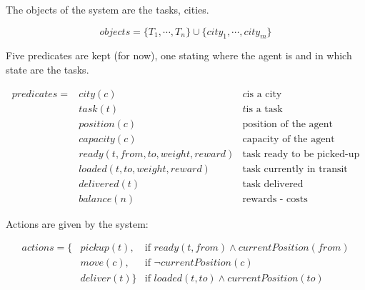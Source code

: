 \documentclass[11pt,a4paper]{article}
\begin{document}
The objects of the system are the tasks, cities.

$$ objects = \{T_1, \cdots, T_n\} \cup \{city_1, \cdots, city_m\} $$

Five predicates are kept (for now), one stating where the agent is and in which
state are the tasks.

\begin{align*}
predicates = &city(c)                            & c \text{is a city} \\
             &task(t)                            & t \text{is a task} \\
             &position(c)                        & \text{position of the agent}      \\
             &capacity(c)                        & \text{capacity of the agent}      \\
             &ready(t, from, to, weight, reward) & \text{task ready to be picked-up} \\
             &loaded(t, to, weight, reward)      & \text{task currently in transit}  \\
             &delivered(t)                       & \text{task delivered}             \\
             &balance(n)                         & \text{rewards - costs}
\end{align*}

Actions are given by the system:

\begin{align*}
actions = \{&pickup(t),   & \text{if } ready(t, from) \wedge currentPosition(from) \\
            &move(c),     & \text{if } \lnot currentPosition(c)                    \\
            &deliver(t)\} & \text{if } loaded(t, to) \wedge currentPosition(to)
\end{align*}
\end{document}
